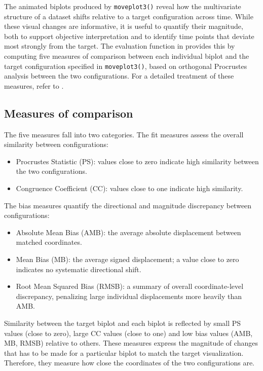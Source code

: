The animated biplots produced by \texttt{moveplot3()} reveal how the multivariate structure of a dataset shifts relative to a target configuration across time. While these visual changes are informative, it is useful to quantify their magnitude, both to support objective interpretation and to identify time points that deviate most strongly from the target. The evaluation function in  provides this by computing five measures of comparison between each individual biplot and the target configuration specified in \texttt{moveplot3()}, based on orthogonal Procrustes analysis between the two configurations. For a detailed treatment of these measures, refer to \citet{GPAbinart}.

\subsection{Measures of comparison}\label{measures-of-comparison}

The five measures fall into two categories. The fit measures assess the overall similarity between configurations:

\begin{itemize}
\tightlist
\item
  Procrustes Statistic (PS): values close to zero indicate high similarity between the two configurations.
\item
  Congruence Coefficient (CC): values close to one indicate high similarity.
\end{itemize}

The bias measures quantify the directional and magnitude discrepancy between configurations:

\begin{itemize}
\tightlist
\item
  Absolute Mean Bias (AMB): the average absolute displacement between matched coordinates.
\item
  Mean Bias (MB): the average signed displacement; a value close to zero indicates no systematic directional shift.
\item
  Root Mean Squared Bias (RMSB): a summary of overall coordinate-level discrepancy, penalizing large individual displacements more heavily than AMB.
\end{itemize}

Similarity between the target biplot and each biplot is reflected by small PS values (close to zero), large CC values (close to one) and low bias values (AMB, MB, RMSB) relative to others. These measures express the magnitude of changes that has to be made for a particular biplot to match the target visualization. Therefore, they measure how close the coordinates of the two configurations are.

